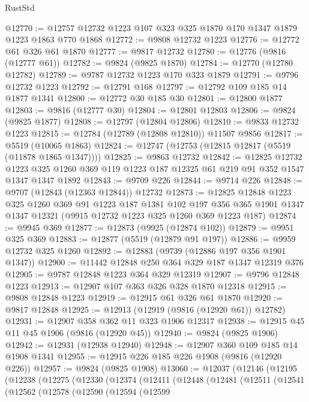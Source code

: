\begin{lexlean}{RustStd}
\begin{coremodule}
@12770 := @12757 @12732 @1223 @107 @323 @325 @1870 @170 @1347 @1879 @1223 @1863 @770 @1868
@12772 := @9808 @12732 @1223
@12776 := @12772 @61 @326 @61 @1870
@12777 := @9817 @12732
@12780 := @12776 (@9816 (@12777 @61))
@12782 := @9824 (@9825 @1870)
@12784 := @12770 (@12780 @12782)
@12789 := @9787 @12732 @1223 @170 @323 @1879
@12791 := @9796 @12732 @1223
@12792 := @12791 @168
@12797 := @12792 @109 @185 @14 @1877 @1341
@12800 := @12772 @30 @185 @30
@12801 := @12800 @1877
@12803 := @9816 (@12777 @30)
@12804 := @12801 @12803
@12806 := @9824 (@9825 @1877)
@12808 := @12797 (@12804 @12806)
@12810 := @9833 @12732 @1223
@12815 := @12784 (@12789 (@12808 @12810)) @11507 @9856
@12817 := @5519 (@10065 @1863)
@12824 := @12747 (@12753 (@12815 @12817 (@5519 (@11878 @1865 @1347))))
@12825 := @9863 @12732
@12842 := @12825
    @12732
    @1223
    @325
    @1260
    @369
    @119
    @1223
    @187
    @12325
    @61
    @219
    @91
    @352
    @1547
    @1347
    @1347
    @1892
@12843 := @9709 @226
@12844 := @9714 @226
@12848 := @9707 (@12843 (@12363 @12844)) @12732
@12873 := @12825
    @12848
    @1223
    @325
    @1260
    @369
    @91
    @1223
    @187
    @1381
    @102
    @197
    @356
    @365
    @1901
    @1347
    @1347
    @12321
    (@9915 @12732 @1223 @325 @1260 @369 @1223 @187)
@12874 := @9945 @369
@12877 := @12873 (@9925 (@12874 @102))
@12879 := @9951 @325 @369
@12883 := @12877 (@5519 (@12879 @91 @197))
@12886 := @9959 @12732 @325 @1260
@12892 := @12883 (@9739 (@12886 @197 @356 @1901 @1347))
@12900 := @11442 @12848 @250 @364 @329 @187 @1347 @12319 @376
@12905 := @9787 @12848 @1223 @364 @329 @12319
@12907 := @9796 @12848 @1223
@12913 := @12907 @107 @363 @326 @328 @1870 @12318
@12915 := @9808 @12848 @1223
@12919 := @12915 @61 @326 @61 @1870
@12920 := @9817 @12848
@12925 := @12913 (@12919 (@9816 (@12920 @61)) @12782)
@12931 := @12907 @358 @362 @11 @323 @1906 @12317
@12938 := @12915 @45 @11 @45 @1906 (@9816 (@12920 @45))
@12940 := @9824 (@9825 @1906)
@12942 := @12931 (@12938 @12940)
@12948 := @12907 @360 @109 @185 @14 @1908 @1341
@12955 := @12915 @226 @185 @226 @1908 (@9816 (@12920 @226))
@12957 := @9824 (@9825 @1908)
@13060 := @12037
    (@12146
      (@12195
        (@12238
          (@12275
            (@12330
              (@12374
                (@12411
                  (@12448
                    (@12481
                      (@12511
                        (@12541
                          (@12562
                            (@12578
                              (@12590
                                (@12594
                                  (@12599

\end{coremodule}
\end{lexlean}
